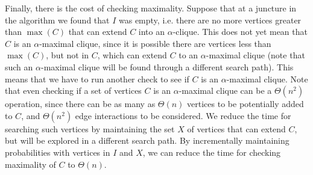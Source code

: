 \documentclass[11pt,letterpaper]{article}
\begin{document}
Finally, there is the cost of checking maximality. Suppose that at a juncture in the algorithm we found that $I$ was empty, i.e. there are no more vertices greater than $\max(C)$ that can extend $C$ into an $\alpha$-clique. This does not yet mean that $C$ is an $\alpha$-maximal clique, since it is possible there are vertices less than $\max(C)$, but not in $C$, which can extend $C$ to an $\alpha$-maximal clique (note that such an $\alpha$-maximal clique will be found through a different search path). This means that we have to run another check to see if $C$ is an $\alpha$-maximal clique. Note that even checking if a set of vertices $C$ is an $\alpha$-maximal clique can be a $\Theta(n^2)$ operation, since there can be as many as $\Theta(n)$ vertices to be potentially added to $C$, and $\Theta(n^2)$ edge interactions to be considered. We reduce the time for searching such vertices by maintaining the set $X$ of vertices that can extend $C$, but will be explored in a different search path. By incrementally maintaining probabilities with vertices in $I$ and $X$, we can reduce the time for checking maximality of $C$ to $\Theta(n)$.
\end{document}
